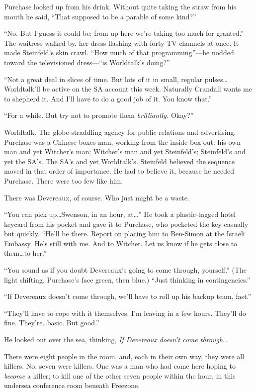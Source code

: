 Purchase looked up from his drink. Without quite taking the straw from his mouth he said, ``That supposed to be a parable of some kind?''

``No. But I guess it could be: from up here we're taking too much for granted.'' The waitress walked by, her dress flashing with forty TV channels at once. It made Steinfeld's skin crawl. ``How much of that programming''---he nodded toward the televisioned dress---``is Worldtalk's doing?''

``Not a great deal in slices of time. But lots of it in small, regular pulses\ldots Worldtalk'll be active on the SA account this week. Naturally Crandall wants me to shepherd it. And I'll have to do a good job of it. You know that.''

``For a while. But try not to promote them \textit{brilliantly.} Okay?''

Worldtalk. The globe-straddling agency for public relations and advertising. Purchase was a Chinese-boxes man, working from the inside box out: his own man and yet Witcher's man; Witcher's man and yet Steinfeld's; Steinfeld's and yet the SA's. The SA's and yet Worldtalk's. Steinfeld believed the sequence moved in that order of importance. He had to believe it, because he needed Purchase. There were too few like him.

There was Devereaux, of course. Who just might be a waste.

``You can pick up\ldots Swenson, in an hour, at\ldots '' He took a plastic-tagged hotel keycard from his pocket and gave it to Purchase, who pocketed the key casually but quickly. ``He'll be there. Report on placing him to Ben-Simon at the Israeli Embassy. He's still with me. And to Witcher. Let us know if he gets close to them\ldots to her.''

``You sound as if you doubt Devereaux's going to come through, yourself.'' (The light shifting, Purchase's face green, then blue.) ``Just thinking in contingencies.''

``If Devereaux doesn't come through, we'll have to roll up his backup team, fast.''

``They'll have to cope with it themselves. I'm leaving in a few hours. They'll do fine. They're\ldots basic. But good.''

He looked out over the sea, thinking, \textit{If Devereaux doesn't come through}\ldots

There were eight people in the room, and, each in their own way, they were all killers. No: seven were killers. One was a man who had come here hoping to \textit{become} a killer; to kill one of the other seven people within the hour, in this undersea conference room beneath Freezone.

